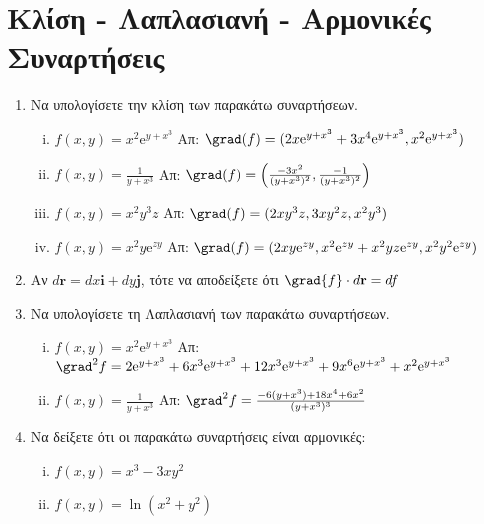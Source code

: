 



\pagestyle{askhseis}
\everymath{\displaystyle}




\begin{center}
  {\color{Col2}}
\end{center} 


\section*{Κλίση - Λαπλασιανή - Αρμονικές Συναρτήσεις}

\begin{enumerate}
  \item Να υπολογίσετε την κλίση των παρακάτω συναρτήσεων.
    \begin{enumerate}[i)]
      \item $ f(x,y) = x^{2} \mathrm{e}^{y+x^{3}} $ 
        \hfill Απ: $ \grad(f) = (2x\mathrm{e}^{y+x^{3}}+3x^{4}\mathrm{e}^{y+x^{3}}, 
        x^{2} \mathrm{e}^{y+x^{3}}) $ 
      \item $ f(x,y) = \frac{1}{y+x^{3}} $ 
        \hfill Απ: $\grad(f) =\left(\frac{-3x^{2}}{(y+x^{3})^{2}},
        \frac{-1}{(y+x^{3})^{2}}\right)$ 
      \item $ f(x,y) = x^{2}y^{3}z $   
        \hfill Απ: $ \grad(f) = (2xy^{3}z,3xy^{2}z,x^{2}y^{3}) $ 
      \item $ f(x,y) = x^{2} y \mathrm{e}^{zy}  $ 
        \hfill Απ: $ \grad(f) = (2xy\mathrm{e}^{zy},
        x^{2}\mathrm{e}^{zy}+x^{2}yz\mathrm{e}^{zy},x^{2}y^{2} \mathrm{e}^{zy})$ 
    \end{enumerate}

  \item Αν $ d\mathbf{r} = dx \mathbf{i}+ dy \mathbf{j}$, τότε να αποδείξετε ότι 
    $ \grad{f} \cdot d \mathbf{r} = df $

  \item Να υπολογίσετε τη Λαπλασιανή των παρακάτω συναρτήσεων.
    \begin{enumerate}[i)]
      \item $ f(x,y) = x^{2} \mathrm{e}^{y+x^{3}} $ 
        \hfill Απ: $ \grad^{2} f = 2 \mathrm{e}^{y+x^{3}} + 6x^{3} \mathrm{e}^{y+x^{3}} 
        + 12x^{3} \mathrm{e}^{y+x^{3}} + 9x^{6} \mathrm{e}^{y+x^{3}} + x^{2}
        \mathrm{e}^{y+x^{3}} $ 
      \item $ f(x,y) = \frac{1}{y+x^{3}} $
        \hfill Απ: $ \grad^{2}f = \frac{-6(y+x^{3})+18x^{4}+6x^{2}}{(y+x^{3})^{3}} $ 
    \end{enumerate}

  \item Να δείξετε ότι οι παρακάτω συναρτήσεις είναι αρμονικές:
    \begin{enumerate}[(i)]
      \item $ f(x,y) = x^{3}-3xy^{2} $
      \item $ f(x,y) = \ln(x^{2} + y^{2}) $
    \end{enumerate}
\end{enumerate}

